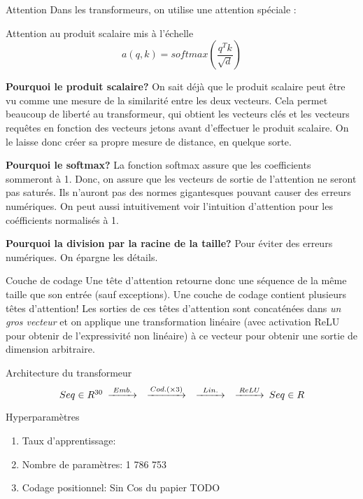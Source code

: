 \documentclass{beamer}
\begin{document}
\begin{frame}{Attention}
Dans les transformeurs, on utilise une attention spéciale :
\begin{block}{Attention au produit scalaire mis à l'échelle}
    \[ a(q, k) = softmax( \frac{q^Tk}{\sqrt{d}}) \]
\end{block}


{\bf Pourquoi le produit scalaire?}
On sait déjà que le produit scalaire peut être vu comme une mesure de la similarité entre
les deux vecteurs. Cela permet beaucoup de liberté au transformeur, qui obtient les vecteurs clés et les vecteurs requêtes en fonction des vecteurs jetons avant d'effectuer le produit scalaire. On le laisse donc créer sa propre mesure de distance, en quelque sorte.

\end{frame}

\begin{frame}{}
    
{\bf Pourquoi le softmax?}
La fonction softmax assure que les coefficients sommeront à 1. Donc, on assure que les 
vecteurs de sortie de l'attention ne seront pas saturés. Ils n'auront pas des normes gigantesques pouvant causer des erreurs numériques. On peut aussi intuitivement voir l'intuition d'attention pour les coéfficients normalisés à 1.

{\bf Pourquoi la division par la racine de la taille? }
Pour éviter des erreurs numériques. On épargne les détails.

\end{frame}

\begin{frame}{Couche de codage}
    Une tête d'attention retourne donc une séquence de la même taille que son entrée (sauf exceptions).
    Une couche de codage contient plusieurs têtes d'attention! Les sorties de ces 
    têtes d'attention sont concaténées dans {\it un gros vecteur} et on applique une transformation 
    linéaire (avec activation ReLU pour obtenir de l'expressivité non linéaire) à ce vecteur pour obtenir une sortie 
    de dimension arbitraire.
\end{frame}

\begin{frame}{Architecture du transformeur}
\begin{equation*}
    \begin{CD}
        @. Seq \in R^{30}
        @>Emb.>> 
        @>Cod. (\times 3)>> 
        @>Lin.>> 
        @>ReLU>> Seq \in R
    \end{CD}
\end{equation*}

\begin{block}{Hyperparamètres}
\begin{enumerate}
    \item Taux d'apprentissage:
    \item Nombre de paramètres: 1 786 753 
    \item Codage positionnel: Sin Cos du papier TODO
\end{enumerate}
\end{block}
\end{frame}
\end{document}
